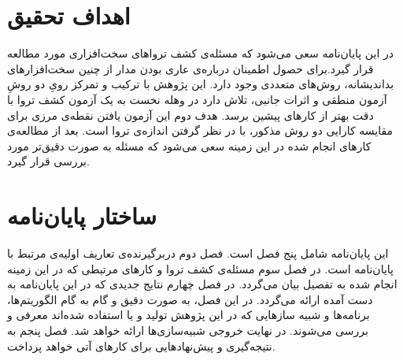 \section{اهداف تحقیق}

در این پایان‌نامه سعی می‌شود که مسئله‌ی کشف ترواهای سخت‌افزاری مورد مطالعه قرار گیرد.برای حصول اطمینان درباره‌ی عاری بودن مدار از چنین سخت‌افزارهای بداندیشانه، روش‌های متعددی وجود دارد. این پژوهش با ترکیب و تمرکز رویِ دو روشِ آزمون منطقی و اثرات جانبی‌‌، تلاش دارد در وهله نخست به یک آزمون کشف تروا با دقت بهتر از کارهای پیشین برسد. هدف دوم این آزمون یافتن نقطه‌ی مرزی برای مقایسه کارایی دو روش مذکور، با در نظر گرفتن اندازه‌ی تروا است. بعد از مطالعه‌ی کارهای انجام شده در این زمینه سعی می‌شود که مسئله به صورت دقیق‌تر مورد بررسی قرار گیرد.

\section{ساختار پایان‌نامه}

این پایان‌نامه شامل پنج فصل است. 
فصل دوم دربرگیرنده‌ی تعاریف اولیه‌ی مرتبط با پایان‌نامه است. 
در فصل سوم مسئله‌ی کشف تروا و کارهای مرتبطی که در این زمینه انجام شده به تفصیل بیان می‌گردد. 
در فصل چهارم نتایج جدیدی که در این پایان‌نامه به دست آمده ارائه می‌گردد. در این فصل، به صورت دقیق و گام به گام الگوریتم‌ها، برنامه‌ها و شبیه سازهایی که در این پژوهش تولید و یا استفاده شده‌اند معرفی و بررسی می‌شوند. در نهایت خروجی شبیه‌سازی‌ها ارائه خواهد شد.
فصل پنجم به نتیجه‌گیری و پیش‌نهادهایی برای کارهای آتی خواهد پرداخت.

